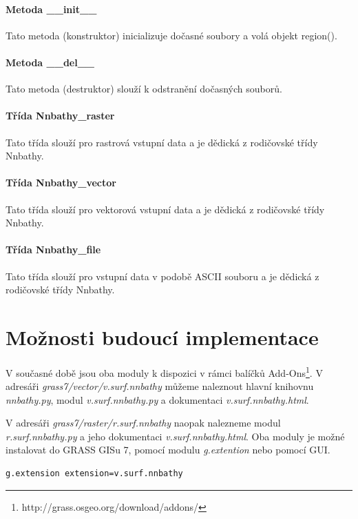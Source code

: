 \documentclass[12pt,a4paper]{article}
\begin{document}
\paragraph{Metoda \_\_init\_\_}
Tato metoda (konstruktor) inicializuje dočasné soubory a volá objekt region().

\paragraph{Metoda \_\_del\_\_}
Tato metoda (destruktor) slouží k odstranění dočasných souborů.

\paragraph{Třída Nnbathy\_raster}
Tato třída slouží pro rastrová vstupní data a je dědická z rodičovské třídy Nnbathy.

\paragraph{Třída Nnbathy\_vector}
Tato třída slouží pro vektorová vstupní data a je dědická z rodičovské třídy Nnbathy.

\paragraph{Třída Nnbathy\_file}
Tato třída slouží pro vstupní data v podobě ASCII souboru a je dědická z rodičovské třídy Nnbathy.


\newpage
\section{Možnosti budoucí implementace}
V současné době jsou oba moduly k dispozici v rámci balíčků
Add-Ons\footnote{http://grass.osgeo.org/download/addons/}. V adresáři
\emph{grass7/vector/v.surf.nnbathy} můžeme naleznout hlavní knihovnu
\emph{nnbathy.py}, modul \emph{v.surf.nnbathy.py} a dokumentaci
\emph{v.surf.nnbathy.html}.

V adresáři \emph{grass7/raster/r.surf.nnbathy} naopak nalezneme modul
\emph{r.surf.nnbathy.py} a jeho dokumentaci
\emph{v.surf.nnbathy.html}. Oba moduly je možné instalovat do GRASS
GISu 7, pomocí modulu \emph{g.extention} nebo pomocí GUI.

\bigskip
\begin{lstlisting}[caption={Stáhnutí modulu v.surf.nnbathy pomocí g.extention}]
g.extension extension=v.surf.nnbathy
\end{lstlisting}
\end{document}
